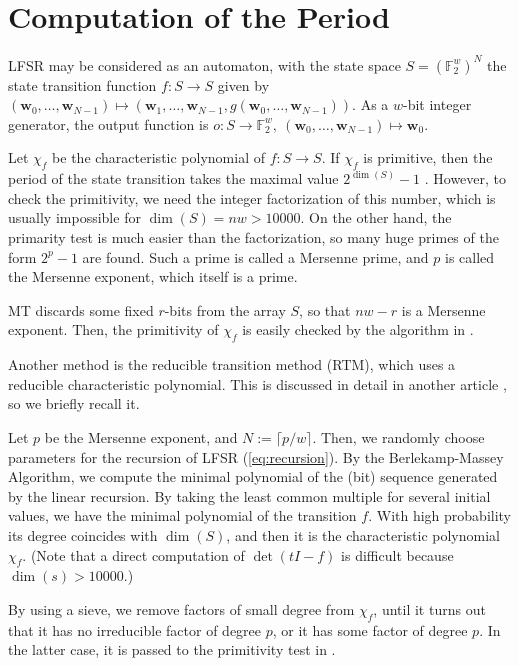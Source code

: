 \documentclass[acmnow]{acmtrans2m}
\def\F2{{\mathbb F}_2}
\def\bw{{{\mathbf w}}}
\begin{document}
\appendix
\section{Computation of the Period}\label{sec:period}
LFSR may be considered as an automaton, 
with the state space $S=(\F2^{w})^{N}$ 
the state transition function 
$f: S \to S$ given by
$(\bw_0,\ldots,\bw_{N-1})
\mapsto (\bw_1,\ldots,\bw_{N-1}, g(\bw_0,\ldots,\bw_{N-1}))$.  
As a $w$-bit integer generator, the output function is 
$o: S \to \F2^{w},\  (\bw_0,\ldots,\bw_{N-1}) \mapsto \bw_0$.

Let $\chi_f$ be the characteristic polynomial of $f:S \to S$.
If $\chi_f$ is primitive, then the 
period of the state transition takes the maximal value
$2^{\dim(S)}-1$ \cite[\S3.2.2]{knuth:bible}. 
However, to check the primitivity, we need
the integer factorization of this number, which is usually 
impossible for $\dim(S)=nw>10000$. 
On the other hand, the primarity test is much easier than 
the factorization, so many huge primes of the form 
$2^p-1$ are found. 
Such a prime is called a Mersenne prime, and $p$ is
called the Mersenne exponent, which itself is a prime.

MT discards some fixed $r$-bits from the
array $S$, so that $nw-r$ is a Mersenne exponent. 
Then, the primitivity of $\chi_f$ is easily checked
by the algorithm in \cite[\S3.2.2]{knuth:bible}.

Another method is the reducible transition method (RTM), 
which uses a reducible characteristic polynomial.
This is discussed in detail in another article \cite{PMT}, 
so we briefly recall it. 

Let $p$ be the Mersenne exponent, and $N:=\lceil p/w \rceil$.
Then, we randomly choose parameters for the recursion of LFSR
(\ref{eq:recursion}).
By the Berlekamp-Massey Algorithm, 
we compute the minimal polynomial of the (bit) sequence
generated by the linear recursion. By taking the least
common multiple for several initial values, we have the 
minimal polynomial of the transition $f$. With high 
probability its degree coincides with $\dim(S)$, and then
it is the characteristic polynomial $\chi_f$. 
(Note that a direct computation of $\det(tI-f)$ is difficult
 because $\dim(s)>10000$.)

By using a sieve, we remove factors of small degree from $\chi_f$,
until it turns out that it has no irreducible factor of degree $p$,
or it has some factor of degree $p$. In the latter case, it is 
passed to the primitivity test in \cite[\S3.2.2]{knuth:bible}.
\end{document}
